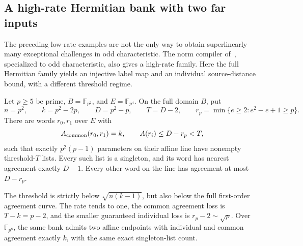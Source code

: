 \subsection{A high-rate Hermitian bank with two far inputs}
\label{sec:odd-hermitian-high-rate}
The preceding low-rate examples are not the only way to obtain
superlinearly many exceptional challenges in odd characteristic.
The norm compiler of~\cite{binary-counterexamples}, specialized to odd
characteristic, also gives a high-rate family. Here the full Hermitian
family yields an injective label map and an individual source-distance
bound, with a different threshold regime.

\begin{theorem}\label{thm:odd-hermitian-high-rate}
Let $p\ge5$ be prime, $B=\mathbb F_{p^2}$, and
$E=\mathbb F_{p^4}$. On the full domain $B$, put
\[
 n=p^2,\qquad k=p^2-2p,\qquad D=p^2-p,\qquad T=D-2,
 \qquad r_p=\min\{e\ge2:e^2-e+1\ge p\}.
\]
There are words $r_0,r_1$ over $E$ with
\[
 A_{\rm common}(r_0,r_1)=k,\qquad A(r_i)\le D-r_p<T,
\]
such that exactly $p^2(p-1)$ parameters on their affine line have
nonempty threshold-$T$ lists. Every such list is a singleton, and
its word has nearest agreement exactly $D-1$. Every other word
on the line has agreement at most $D-r_p$.

The threshold is strictly below $\sqrt{n(k-1)}$, but also below the
full first-order agreement curve. The rate tends to one, the common
agreement loss is $T-k=p-2$, and the smaller guaranteed individual
loss is $r_p-2\sim\sqrt p$. Over $\mathbb F_{p^8}$, the same bank
admits two affine endpoints with individual and common agreement
exactly $k$, with the same exact singleton-list count.
\end{theorem}
